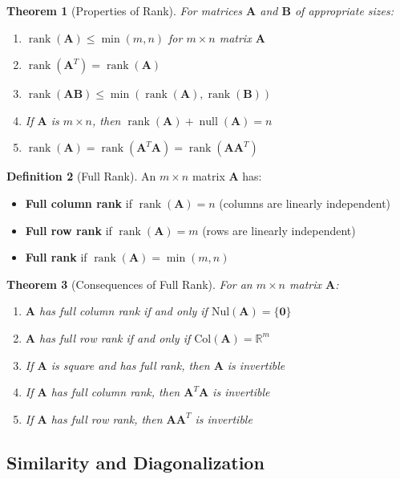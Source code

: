 \documentclass[12pt]{article}
\numberwithin{equation}{section}
\newcommand{\vect}[1]{\boldsymbol{#1}}   %
\newcommand{\mat}[1]{\mathbf{#1}}        %
\newcommand{\rank}{\operatorname{rank}}
\newcommand{\nullity}{\operatorname{null}}
\theoremstyle{plain}
\newtheorem{theorem}{Theorem}[section]
\theoremstyle{definition}
\newtheorem{definition}[theorem]{Definition}
\theoremstyle{remark}
\begin{document}
\begin{theorem}[Properties of Rank]
For matrices $\mat{A}$ and $\mat{B}$ of appropriate sizes:
\begin{enumerate}
\item $\rank(\mat{A}) \leq \min(m, n)$ for $m \times n$ matrix $\mat{A}$
\item $\rank(\mat{A}^T) = \rank(\mat{A})$
\item $\rank(\mat{A}\mat{B}) \leq \min(\rank(\mat{A}), \rank(\mat{B}))$
\item If $\mat{A}$ is $m \times n$, then $\rank(\mat{A}) + \nullity(\mat{A}) = n$
\item $\rank(\mat{A}) = \rank(\mat{A}^T\mat{A}) = \rank(\mat{A}\mat{A}^T)$
\end{enumerate}
\end{theorem}

\begin{definition}[Full Rank]
An $m \times n$ matrix $\mat{A}$ has:
\begin{itemize}
\item \textbf{Full column rank} if $\rank(\mat{A}) = n$ (columns are linearly independent)
\item \textbf{Full row rank} if $\rank(\mat{A}) = m$ (rows are linearly independent)
\item \textbf{Full rank} if $\rank(\mat{A}) = \min(m, n)$
\end{itemize}
\end{definition}

\begin{theorem}[Consequences of Full Rank]
For an $m \times n$ matrix $\mat{A}$:
\begin{enumerate}
\item $\mat{A}$ has full column rank if and only if $\text{Nul}(\mat{A}) = \{\vect{0}\}$
\item $\mat{A}$ has full row rank if and only if $\text{Col}(\mat{A}) = \mathbb{R}^m$
\item If $\mat{A}$ is square and has full rank, then $\mat{A}$ is invertible
\item If $\mat{A}$ has full column rank, then $\mat{A}^T\mat{A}$ is invertible
\item If $\mat{A}$ has full row rank, then $\mat{A}\mat{A}^T$ is invertible
\end{enumerate}
\end{theorem}

\subsection{Similarity and Diagonalization}
\end{document}
